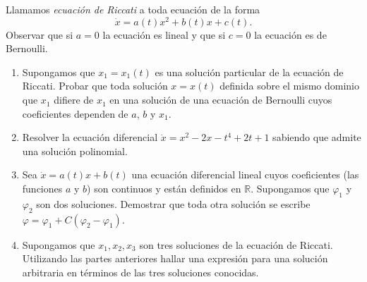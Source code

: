 \begin{ejer}
Llamamos \emph{ecuación de Riccati} a toda ecuación de la forma
\[
    \dot{x} = a(t)x^2 + b(t)x + c(t).
\]
Observar que si $a=0$ la ecuación es lineal y que si $c=0$ la ecuación
es de Bernoulli.
\begin{enumerate}[label = (\alph*)]
    \item Supongamos que $x_1 = x_1(t)$ es una solución particular de la
    ecuación de Riccati. Probar que toda solución $x = x(t)$
    definida sobre el mismo dominio que $x_1$ difiere de $x_1$ en una
    solución de una ecuación de Bernoulli cuyos coeficientes dependen
    de $a$, $b$ y $x_1$.
    
    \item Resolver la ecuación diferencial
    $
        \dot{x} = x^2 - 2x - t^4 + 2t + 1
    $
    sabiendo que admite una solución polinomial.
    
    \item Sea $\dot{x} = a(t)x + b(t)$ una ecuación diferencial lineal cuyos coeficientes
    (las funciones $a$ y $b$) son continuos y están definidos en $\mathbb{R}$.
    Supongamos que $\varphi_1$ y $\varphi_2$ son dos soluciones. Demostrar
    que toda otra solución se escribe
    $
        \varphi = \varphi_1 + C(\varphi_2 - \varphi_1).
    $
    
    \item Supongamos que $x_1, x_2, x_3$ son tres soluciones de la ecuación
    de Riccati. Utilizando las partes anteriores hallar una expresión
    para una solución arbitraria en términos de las tres soluciones
    conocidas.
\end{enumerate}
\end{ejer}
